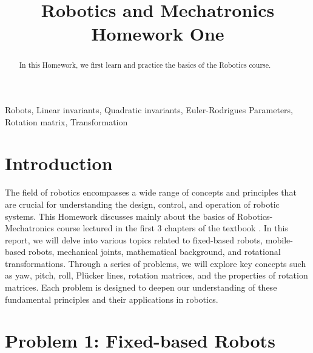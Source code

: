 \documentclass[conference]{IEEEtran}
\begin{document}
\title{Robotics and Mechatronics\\
{\LARGE Homework One}
}

\author{
}

\maketitle

\begin{abstract}
In this Homework, we first learn and practice the basics of the Robotics course. 
\end{abstract}

\begin{IEEEkeywords}
Robots, Linear invariants, Quadratic invariants, Euler-Rodrigues Parameters, Rotation matrix, Transformation
\end{IEEEkeywords}

\section{Introduction}
The field of robotics encompasses a wide range of concepts and principles that are crucial for understanding the design, control, and operation of robotic systems. This Homework discusses mainly about the basics of Robotics-Mechatronics course lectured in the first 3 chapters of the textbook \cite{b1}. In this report, we will delve into various topics related to fixed-based robots, mobile-based robots, mechanical joints, mathematical background, and rotational transformations. Through a series of problems, we will explore key concepts such as yaw, pitch, roll, Plücker lines, rotation matrices, and the properties of rotation matrices. Each problem is designed to deepen our understanding of these fundamental principles and their applications in robotics. 

\vspace{5px}
\section{Problem 1: Fixed-based Robots}
\end{document}
